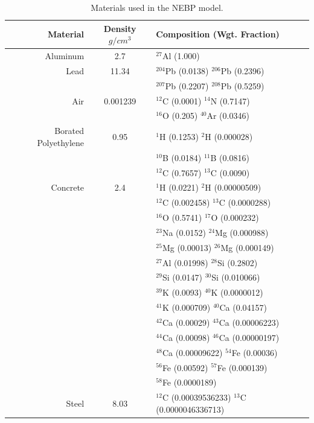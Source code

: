 \begin{table}[h]\centering
\label{tab:nebp_materials}
\caption{Materials used in the NEBP model.}
\begin{tabular}{ r c l }
\toprule
\textbf{Material} & \textbf{Density} $g/cm^3$ & \textbf{Composition (Wgt. Fraction)} \\
\midrule
Aluminum & 2.7 & $^{27}$Al (1.000) \\
\midrule
Lead & 11.34 & $^{204}$Pb (0.0138)  $^{206}$Pb (0.2396) \\
        & & $^{207}$Pb (0.2207)  $^{208}$Pb (0.5259) \\
\midrule
Air & 0.001239 & $^{12}$C (0.0001)  $^{14}$N (0.7147) \\
        & & $^{16}$O (0.205)  $^{40}$Ar (0.0346) \\
\midrule
Borated Polyethylene & 0.95 & $^{1}$H (0.1253)  $^{2}$H (0.000028) \\
                       &  & $^{10}$B (0.0184)   $^{11}$B (0.0816) \\
                       &  & $^{12}$C (0.7657)   $^{13}$C (0.0090) \\
\midrule
Concrete & 2.4 &  $^{1}$H (0.0221) $^{2}$H (0.00000509) \\
& &         $^{12}$C (0.002458)  $^{13}$C (0.0000288) \\
& &           $^{16}$O (0.5741)  $^{17}$O (0.000232) \\
& &          $^{23}$Na (0.0152)   $^{24}$Mg (0.000988) \\
& &          $^{25}$Mg (0.00013)   $^{26}$Mg (0.000149) \\
& &          $^{27}$Al (0.01998)   $^{28}$Si (0.2802) \\
& &          $^{29}$Si (0.0147)  $^{30}$Si (0.010066) \\
& &          $^{39}$K (0.0093)   $^{40}$K (0.0000012) \\
& &          $^{41}$K (0.000709)  $^{40}$Ca (0.04157) \\
& &          $^{42}$Ca (0.00029)    $^{43}$Ca (0.00006223) \\
& &          $^{44}$Ca (0.00098)   $^{46}$Ca (0.00000197) \\
& &          $^{48}$Ca (0.00009622)    $^{54}$Fe (0.00036) \\
& &          $^{56}$Fe (0.00592)   $^{57}$Fe (0.000139) \\
& &          $^{58}$Fe (0.0000189) \\
\midrule
Steel & 8.03 & $^{12}$C (0.00039536233)  $^{13}$C (0.0000046336713) \\

\end{tabular}
\end{table}
